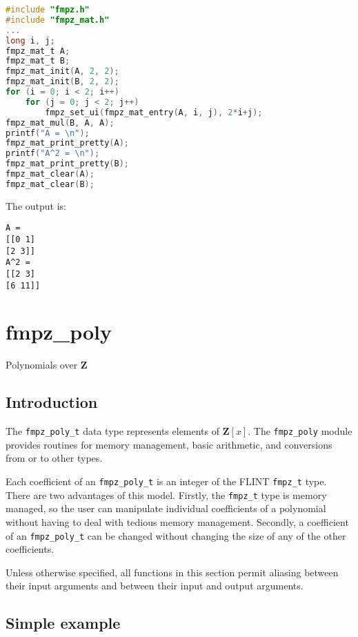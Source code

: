 \documentclass[a4paper,10pt]{book}
\newcommand{\Z}{\mathbf{Z}}%
\newcommand{\code}{\lstinline}
\begin{document}
\begin{lstlisting}[language=c]
#include "fmpz.h"
#include "fmpz_mat.h"
...
long i, j;
fmpz_mat_t A;
fmpz_mat_t B;
fmpz_mat_init(A, 2, 2);
fmpz_mat_init(B, 2, 2);
for (i = 0; i < 2; i++)
    for (j = 0; j < 2; j++)
        fmpz_set_ui(fmpz_mat_entry(A, i, j), 2*i+j);
fmpz_mat_mul(B, A, A);
printf("A = \n");
fmpz_mat_print_pretty(A);
printf("A^2 = \n");
fmpz_mat_print_pretty(B);
fmpz_mat_clear(A);
fmpz_mat_clear(B);
\end{lstlisting}

The output is:
\begin{lstlisting}
A = 
[[0 1]
[2 3]]
A^2 = 
[[2 3]
[6 11]]
\end{lstlisting}





\chapter{fmpz\_poly}
\epigraph{Polynomials over $\Z$}{}

\section{Introduction}

The \code{fmpz_poly_t} data type represents elements of $\Z[x]$. The 
\code{fmpz_poly} module provides routines for memory management, basic 
arithmetic, and conversions from or to other types.

Each coefficient of an \code{fmpz_poly_t} is an integer of the FLINT 
\code{fmpz_t} type.  There are two advantages of this model.  Firstly, 
the \code{fmpz_t} type is memory managed, so the user can manipulate 
individual coefficients of a polynomial without having to deal with 
tedious memory management.  Secondly, a coefficient of an 
\code{fmpz_poly_t} can be changed without changing the size of any 
of the other coefficients.

Unless otherwise specified, all functions in this section permit aliasing 
between their input arguments and between their input and output arguments.

\section{Simple example}
\end{document}
